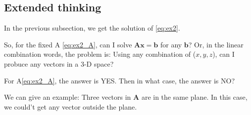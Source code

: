     \subsection{Extended thinking}
        In the previous subsection, we get the solution of \eqref{eq:ex2}.

        So, for the fixed A \eqref{eq:ex2_A}, can I solve $\mathbf{Ax=b}$ for any $\mathbf{b}$?
        Or, in the linear combination words, the problem is: Using any combination of ($x,y,z$), 
        can I probuce any vectors in a 3-D space?
        
        For A\eqref{eq:ex2_A}, the answer is YES. Then in what case, the answer is NO? 

        We can give an example: Three vectors in $\mathbf{A}$ are in the same plane. 
        In this case, we could't get any vector outside the plane.
        